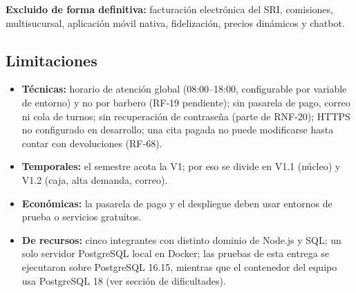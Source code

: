 \documentclass[12pt,a4paper,oneside]{article}
\begin{document}
\textbf{Excluido de forma definitiva:} facturaci\'on electr\'onica del SRI, comisiones, multisucursal, aplicaci\'on m\'ovil nativa, fidelizaci\'on, precios din\'amicos y chatbot.

\subsection{Limitaciones}
\begin{itemize}[nosep]
\item \textbf{T\'ecnicas:} horario de atenci\'on global (08:00--18:00, configurable por variable de entorno) y no por barbero (RF-19 pendiente); sin pasarela de pago, correo ni cola de turnos; sin recuperaci\'on de contrase\~na (parte de RNF-20); HTTPS no configurado en desarrollo; una cita pagada no puede modificarse hasta contar con devoluciones (RF-68).
\item \textbf{Temporales:} el semestre acota la V1; por eso se divide en V1.1 (n\'ucleo) y V1.2 (caja, alta demanda, correo).
\item \textbf{Econ\'omicas:} la pasarela de pago y el despliegue deben usar entornos de prueba o servicios gratuitos.
\item \textbf{De recursos:} cinco integrantes con distinto dominio de Node.js y SQL; un solo servidor PostgreSQL local en Docker; las pruebas de esta entrega se ejecutaron sobre PostgreSQL 16.15, mientras que el contenedor del equipo usa PostgreSQL 18 (ver secci\'on de dificultades).
\end{itemize}
\end{document}

